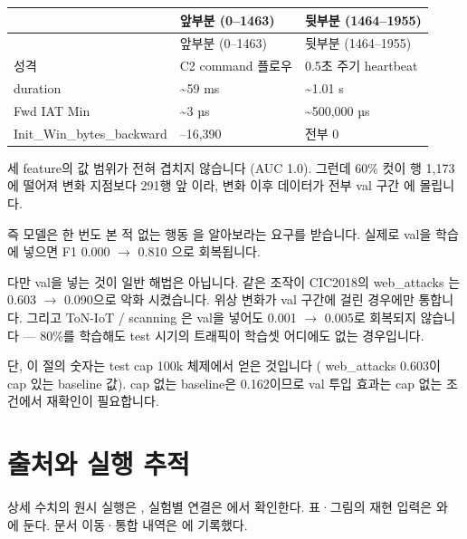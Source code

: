 \begingroup
\footnotesize
\begin{longtable}{>{\raggedright\arraybackslash}p{}>{\raggedright\arraybackslash}p{}>{\raggedright\arraybackslash}p{}}
\toprule
 & 앞부분 (0–1463) & 뒷부분 (1464–1955) \\ \midrule
\endfirsthead
 & 앞부분 (0–1463) & 뒷부분 (1464–1955) \\ \midrule
\endhead
{}성격 & C2 command 플로우 & 0.5초 주기 heartbeat \\
{}duration & \textasciitilde{}59 ms & \textasciitilde{}1.01 s \\
{}Fwd IAT Min & \textasciitilde{}3 µs & \textasciitilde{}500,000 µs \\
{}Init\_\allowbreak{}Win\_\allowbreak{}bytes\_\allowbreak{}backward & 110–16,390 & 전부 0 \\
\bottomrule
\end{longtable}
\endgroup
세 feature의 값 범위가 전혀 겹치지 않습니다 (AUC 1.0). 그런데 60\% 컷이 행 1,173에 떨어져 변화 지점보다 291행 앞 이라, 변화 이후 데이터가 전부 val 구간 에 몰립니다.

즉 모델은 한 번도 본 적 없는 행동 을 알아보라는 요구를 받습니다. 실제로 val을 학습에 넣으면 F1 0.000  \ensuremath{\rightarrow}  0.810 으로 회복됩니다.

다만 val을 넣는 것이 일반 해법은 아닙니다. 같은 조작이 CIC2018의 web\_\allowbreak{}attacks 는 0.603  \ensuremath{\rightarrow}  0.090으로 악화 시켰습니다. 위상 변화가 val 구간에 걸린 경우에만 통합니다. 그리고 ToN-IoT /\allowbreak{} scanning 은 val을 넣어도 0.001  \ensuremath{\rightarrow}  0.005로 회복되지 않습니다 — 80\%를 학습해도 test 시기의 트래픽이 학습셋 어디에도 없는 경우입니다.

단, 이 절의 숫자는 test cap 100k 체제에서 얻은 것입니다 ( web\_\allowbreak{}attacks 0.603이 cap 있는 baseline 값). cap 없는 baseline은 0.162이므로 val 투입 효과는 cap 없는 조건에서 재확인이 필요합니다.



\section*{출처와 실행 추적}

상세 수치의 원시 실행은 , 실험별 연결은 에서 확인한다. 표·그림의 재현 입력은 와 에 둔다. 문서 이동·통합 내역은 에 기록했다.


